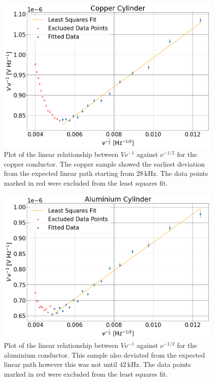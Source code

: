 \documentclass[a4paper,12pt,twocolumn]{article}
\begin{document}
	\begin{figure}
		\centering
		\includegraphics[scale=0.4]{copperGraph.png}
		\captionsetup{font=scriptsize}
		\caption{Plot of the linear relationship between $V\nu^{-1}$ against $\nu^{-1/2}$ for the copper conductor. The copper sample showed the earliest deviation from the expected linear path starting from $28 \,\text{kHz}$. The data points marked in red were excluded from the least squares fit.}
		\label{fig:copperGraph}
	\end{figure}
	\begin{figure}
		\centering
		\includegraphics[scale=0.4]{aluminiumGraph.png}
		\captionsetup{font=scriptsize}
		\caption{Plot of the linear relationship between $V\nu^{-1}$ against $\nu^{-1/2}$ for the aluminium conductor. This sample also deviated from the expected linear path however this was not until $42 \,\text{kHz}$. The data points marked in red were excluded from the least squares fit.}
		\label{fig:aluminiumGraph}
	\end{figure}
\end{document}
